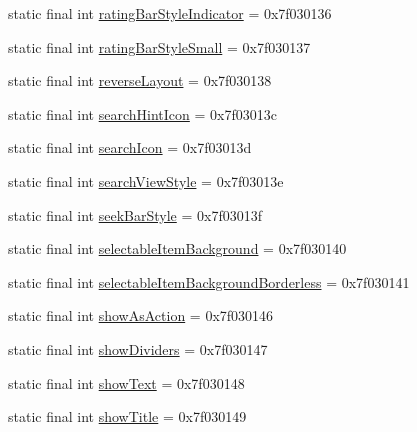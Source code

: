 \begin{DoxyCompactItemize}
\item 
static final int \mbox{\hyperlink{classcom_1_1synnapps_1_1carouselview_1_1_r_1_1attr_ac5957ff3ecf41714be415e227b2ed0a0}{rating\+Bar\+Style\+Indicator}} = 0x7f030136
\item 
static final int \mbox{\hyperlink{classcom_1_1synnapps_1_1carouselview_1_1_r_1_1attr_a65dcc3ab2bc5b9af081b66f9916bb0b6}{rating\+Bar\+Style\+Small}} = 0x7f030137
\item 
static final int \mbox{\hyperlink{classcom_1_1synnapps_1_1carouselview_1_1_r_1_1attr_a4fb9f4c004af4313afc11794910c3e55}{reverse\+Layout}} = 0x7f030138
\item 
static final int \mbox{\hyperlink{classcom_1_1synnapps_1_1carouselview_1_1_r_1_1attr_ab6906305e0b8d4706b09d565f0e2cc6c}{search\+Hint\+Icon}} = 0x7f03013c
\item 
static final int \mbox{\hyperlink{classcom_1_1synnapps_1_1carouselview_1_1_r_1_1attr_a0692b865c5c17bf869e318a3f1420177}{search\+Icon}} = 0x7f03013d
\item 
static final int \mbox{\hyperlink{classcom_1_1synnapps_1_1carouselview_1_1_r_1_1attr_a7ff11fe017cb1d1ad3f22cd209b80e4a}{search\+View\+Style}} = 0x7f03013e
\item 
static final int \mbox{\hyperlink{classcom_1_1synnapps_1_1carouselview_1_1_r_1_1attr_ac7b5428c49e831c596807800cb3af3f3}{seek\+Bar\+Style}} = 0x7f03013f
\item 
static final int \mbox{\hyperlink{classcom_1_1synnapps_1_1carouselview_1_1_r_1_1attr_a93aaf71a22501be40c494eb3fe3d1adc}{selectable\+Item\+Background}} = 0x7f030140
\item 
static final int \mbox{\hyperlink{classcom_1_1synnapps_1_1carouselview_1_1_r_1_1attr_a96b91e17e41c1c0ae7311fbade37d088}{selectable\+Item\+Background\+Borderless}} = 0x7f030141
\item 
static final int \mbox{\hyperlink{classcom_1_1synnapps_1_1carouselview_1_1_r_1_1attr_ad3687d203d76a2820bf6feefd5389736}{show\+As\+Action}} = 0x7f030146
\item 
static final int \mbox{\hyperlink{classcom_1_1synnapps_1_1carouselview_1_1_r_1_1attr_a6ced9ff6c4daa3d8aff6d1ce9fe96ac5}{show\+Dividers}} = 0x7f030147
\item 
static final int \mbox{\hyperlink{classcom_1_1synnapps_1_1carouselview_1_1_r_1_1attr_ac18dcbf67c37d0e7407ec82a5b1d0fe1}{show\+Text}} = 0x7f030148
\item 
static final int \mbox{\hyperlink{classcom_1_1synnapps_1_1carouselview_1_1_r_1_1attr_a39916b1702a4e400f8474b46c95e18af}{show\+Title}} = 0x7f030149

\end{DoxyCompactItemize}
